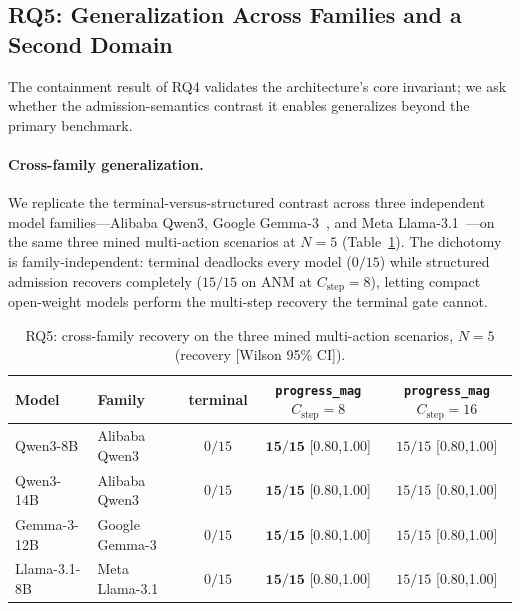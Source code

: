 \subsection{RQ5: Generalization Across Families and a Second Domain}
\label{sec:eval:rq5}

The containment result of RQ4 validates the architecture's core invariant; we ask whether the admission-semantics contrast it enables generalizes beyond the primary benchmark.

\paragraph{Cross-family generalization.}
We replicate the terminal-versus-structured contrast across three independent model families---Alibaba Qwen3, Google Gemma-3~\cite{gemma3}, and Meta Llama-3.1~\cite{llama3}---on the same three mined multi-action scenarios at $N{=}5$ (Table~\ref{tab:crossfamily}). The dichotomy is family-independent: terminal deadlocks every model ($0/15$) while structured admission recovers completely ($15/15$ on ANM at $C_{\text{step}}{=}8$), letting compact open-weight models perform the multi-step recovery the terminal gate cannot.

\begin{table}[ht]
\centering
\caption{RQ5: cross-family recovery on the three mined multi-action scenarios, $N{=}5$ (recovery [Wilson 95\% CI]).}
\label{tab:crossfamily}
\footnotesize
\setlength{\tabcolsep}{4pt}
\begin{tabular*}{\textwidth}{@{\extracolsep{\fill}}llccc}
\toprule
Model & Family & terminal & \makecell[c]{\texttt{progress\_mag}\\$C_{\text{step}}{=}8$} & \makecell[c]{\texttt{progress\_mag}\\$C_{\text{step}}{=}16$} \\
\midrule
Qwen3-8B    & Alibaba Qwen3   & $0/15$ & $\mathbf{15/15}$ {\scriptsize[0.80,1.00]} & $15/15$ {\scriptsize[0.80,1.00]} \\
Qwen3-14B   & Alibaba Qwen3   & $0/15$ & $\mathbf{15/15}$ {\scriptsize[0.80,1.00]} & $15/15$ {\scriptsize[0.80,1.00]} \\
Gemma-3-12B & Google Gemma-3  & $0/15$ & $\mathbf{15/15}$ {\scriptsize[0.80,1.00]} & $15/15$ {\scriptsize[0.80,1.00]} \\
Llama-3.1-8B & Meta Llama-3.1 & $0/15$ & $\mathbf{15/15}$ {\scriptsize[0.80,1.00]} & $15/15$ {\scriptsize[0.80,1.00]} \\
\bottomrule
\end{tabular*}
\end{table}

